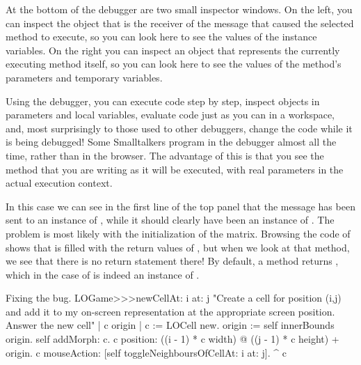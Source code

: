 \documentclass[a4paper,10pt,twoside]{book}
\begin{document}
{At the bottom of the debugger are two small inspector windows.  On the left, you can inspect the object that is the receiver of the message that caused the selected method to execute, so you can look here to see the values of the instance variables.
On the right you can inspect an object that represents the currently executing method itself, so you can look here to see the values of the method's parameters and temporary variables.

Using the debugger, you can execute code step by step, inspect objects in parameters and local variables, evaluate code just as you can in a workspace, and, most surprisingly to those used to other debuggers, change the code while it is being debugged! Some Smalltalkers program in the debugger almost all the time, rather than in the browser.  The advantage of this is that you see the method that you are writing as it will be executed, with real parameters in the actual execution context.

In this case we can see in the first line of the top panel that the  message has been sent to an instance of , while it should clearly have been an instance of .
The problem is most likely with the initialization of the  matrix.
Browsing the code of  shows that  is filled with the return values of , but when we look at that method, we see that there is no return statement there!
By default, a method returns , which in the case of  is indeed an instance of .

\dothis{Close the debugger window.
Add the expression ``\ct{^ c}'' to the end of the method \ct{LOGame>>>newCellAt:at:} so that it returns \ct{c}.
(See \mthref{newCellAt:at:nobug}.)}

\begin{method}{Fixing the bug.}
LOGame>>>newCellAt: i at: j
   "Create a cell for position (i,j) and add it to my on-screen
   representation at the appropriate screen position.  Answer the new cell"
   | c origin |
   c := LOCell new.
   origin := self innerBounds origin.
   self addMorph: c.
   c position: ((i - 1) * c width) @ ((j - 1) * c height) + origin.
   c mouseAction: [self toggleNeighboursOfCellAt: i at: j].
   ^ c
\end{method}

}
\end{document}
